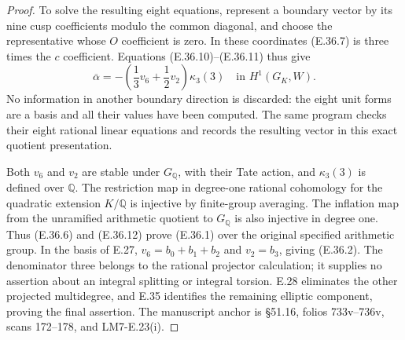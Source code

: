 \documentclass[11pt,oneside]{article}
\begin{document}
\begin{proof}
To solve the resulting eight equations,
represent a boundary vector by its nine
cusp coefficients modulo the common
diagonal, and choose the representative
whose $O$ coefficient is zero. In these
coordinates (E.36.7) is three times the
$c$ coefficient. Equations
(E.36.10)--(E.36.11) thus give
\[
 \overline\alpha=
      -\left(\frac13v_6+\frac12v_2\right)\kappa_3(3)
             \quad\text{in }H^1(G_K,W).
 \tag{E.36.12}
\]
No information in another boundary direction
is discarded: the eight unit forms are a
basis and all their values have been computed.
The same program checks their eight rational
linear equations and records the resulting
vector in this exact quotient presentation.

Both $v_6$ and $v_2$ are stable under
$G_{\mathbb Q}$, with their Tate action,
and $\kappa_3(3)$ is defined over
$\mathbb Q$. The restriction map in
degree-one rational cohomology for the
quadratic extension $K/\mathbb Q$ is
injective by finite-group averaging. The inflation
map from the unramified arithmetic quotient
to $G_{\mathbb Q}$ is also injective in
degree one. Thus (E.36.6) and (E.36.12)
prove (E.36.1) over the original specified
arithmetic group. In the basis of E.27,
$v_6=b_0+b_1+b_2$ and $v_2=b_3$, giving
(E.36.2). The denominator three belongs
to the rational projector calculation;
it supplies no assertion about an
integral splitting or integral torsion.
E.28 eliminates the other projected
multidegree, and E.35 identifies the
remaining elliptic component, proving
the final assertion. The manuscript
anchor is \S51.16, folios 733v--736v,
scans 172--178, and LM7-E.23(i).
\end{proof}
\end{document}
